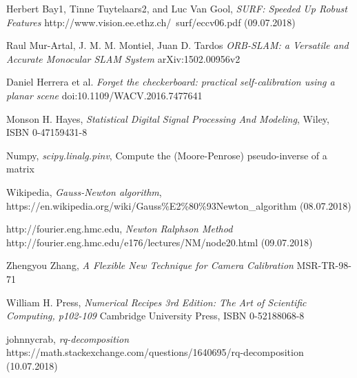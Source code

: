 \documentclass[11pt,a4paper,titlepage,oneside]{report}
\begin{document}
\begin{thebibliography}{1}

  Herbert Bay1, Tinne Tuytelaars2, and Luc Van Gool,
  \textit{SURF: Speeded Up Robust Features}
  http://www.vision.ee.ethz.ch/~surf/eccv06.pdf (09.07.2018)

  Raul Mur-Artal, J. M. M. Montiel, Juan D. Tardos
  \textit{ORB-SLAM: a Versatile and Accurate Monocular SLAM System}
  arXiv:1502.00956v2

  Daniel Herrera et al.
  \textit{Forget the checkerboard: practical self-calibration using a planar scene}
  doi:10.1109/WACV.2016.7477641

  Monson H. Hayes,
  \textit{Statistical Digital Signal Processing And Modeling},
  Wiley, ISBN 0-47159431-8

  Numpy,
  \textit{scipy.linalg.pinv},
  Compute the (Moore-Penrose) pseudo-inverse of a matrix

  Wikipedia,
  \textit{Gauss-Newton algorithm},
  https://en.wikipedia.org/wiki/Gauss\%E2\%80\%93Newton\_algorithm (08.07.2018)

  http://fourier.eng.hmc.edu,
  \textit{Newton Ralphson Method}
  http://fourier.eng.hmc.edu/e176/lectures/NM/node20.html (09.07.2018)

  Zhengyou Zhang,
  \textit{A Flexible New Technique for Camera Calibration}
  MSR-TR-98-71

	William H. Press,
	\textit{Numerical Recipes 3rd Edition: The Art of Scientific Computing, p102-109} 
	Cambridge University Press, ISBN 0-52188068-8

	johnnycrab,
	\textit{rq-decomposition} 
	https://math.stackexchange.com/questions/1640695/rq-decomposition (10.07.2018)

\end{thebibliography}
\end{document}
